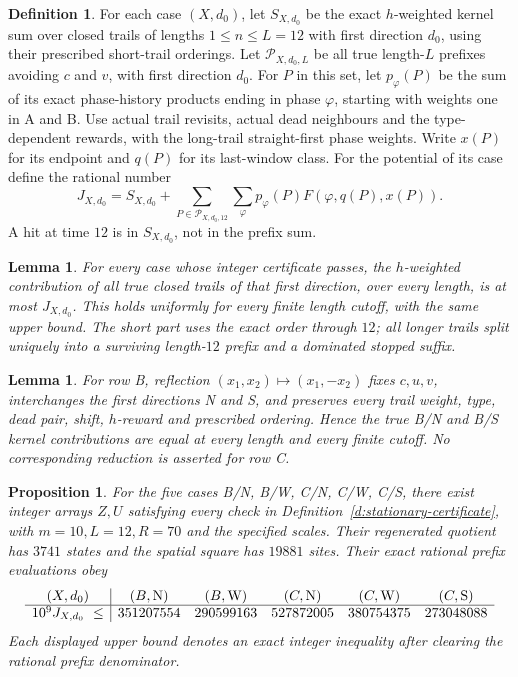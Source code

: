 \documentclass[11pt,reqno]{amsart}
\newtheorem{lemma}[theorem]{Lemma}
\newtheorem{proposition}[theorem]{Proposition}
\theoremstyle{definition}
\newtheorem{definition}[theorem]{Definition}
\theoremstyle{remark}
\begin{document}
\begin{definition}\label{d:prefix-bound}
For each case \((X,d_0)\), let \(S_{X,d_0}\) be the exact
\(h\)-weighted kernel sum over closed trails of lengths \(1\le n\le L=12\)
with first direction \(d_0\), using their prescribed short-trail orderings.
Let \(\mathcal P_{X,d_0,L}\) be all true length-\(L\) prefixes
avoiding \(c\) and \(v\), with first direction \(d_0\).
For \(P\) in this set, let \(p_\varphi(P)\) be the sum of its
exact phase-history products ending in phase \(\varphi\), starting
with weights one in A and B. Use actual trail revisits, actual dead
neighbours and the type-dependent rewards, with the long-trail
straight-first phase weights.
Write \(x(P)\) for its endpoint and \(q(P)\) for its last-window class.
For the potential of its case define the rational number
\[
 J_{X,d_0}=S_{X,d_0}
       +\sum_{P\in\mathcal P_{X,d_0,12}}\sum_\varphi
                    p_\varphi(P)F(\varphi,q(P),x(P)).
\]
A hit at time \(12\) is in \(S_{X,d_0}\), not in the prefix sum.
\end{definition}

\begin{lemma}\label{l:prefix-domination}
For every case whose integer certificate passes, the \(h\)-weighted
contribution of all true closed trails of that first direction,
over every length, is at most \(J_{X,d_0}\).
This holds uniformly for every finite length cutoff, with the same
upper bound. The short part uses the exact order through \(12\);
all longer trails split uniquely into a surviving length-\(12\)
prefix and a dominated stopped suffix.
\end{lemma}

\begin{lemma}\label{l:kernel-reflection}
For row B, reflection \((x_1,x_2)\mapsto(x_1,-x_2)\) fixes
\(c,u,v\), interchanges the first directions N and S, and preserves
every trail weight, type, dead pair, shift, \(h\)-reward and
prescribed ordering. Hence the true B/N and B/S kernel contributions
are equal at every length and every finite cutoff.
No corresponding reduction is asserted for row C.
\end{lemma}

\begin{proposition}\label{p:stationary-check}
For the five cases B/N, B/W, C/N, C/W, C/S, there exist
integer arrays \(Z,U\) satisfying every check in
Definition~\ref{d:stationary-certificate}, with
\(m=10,L=12,R=70\) and the specified scales.
Their regenerated quotient has \(3741\) states and the spatial
square has \(19881\) sites. Their exact rational prefix evaluations obey
\[
 \begin{array}{c|ccccc}
 (X,d_0)&(B,{\rm N})&(B,{\rm W})&(C,{\rm N})&(C,{\rm W})&(C,{\rm S})\\ \hline
 10^9J_{X,d_0}\ \le&
 351207554&290599163&527872005&380754375&273048088
 \end{array}
\]
Each displayed upper bound denotes an exact integer inequality
after clearing the rational prefix denominator.
\end{proposition}
\end{document}
